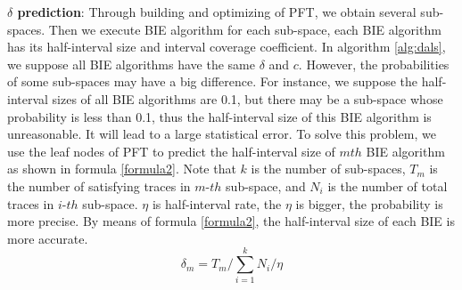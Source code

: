 \textbf{$\delta$ prediction}:
Through building and optimizing of PFT, we obtain several sub-spaces. Then we execute BIE algorithm for each sub-space, each BIE algorithm has its half-interval size and interval coverage coefficient. In algorithm \ref{alg:dals}, we suppose all BIE algorithms have the same $\delta$ and $c$. However, the probabilities of some sub-spaces may have a big difference. For instance, we suppose the half-interval sizes of all BIE algorithms are 0.1, but there may be a sub-space whose probability is less than 0.1, thus the half-interval size of this BIE algorithm is unreasonable. It will lead to a large statistical error. To solve this problem, we use the leaf nodes of PFT to predict the half-interval size of $mth$ BIE algorithm as shown in formula \ref{formula2}. Note that $k$ is the number of sub-spaces, $T_m$ is the number of satisfying traces in $m$-$th$ sub-space, and $N_i$ is the number of total traces in $i$-$th$ sub-space. $\eta$ is half-interval rate, the $\eta$ is bigger, the probability is more precise. By means of formula \ref{formula2}, the half-interval size of each BIE is more accurate.
\begin{equation}
\label{formula2}
\delta_m = T_m / \sum\limits_{i=1}^k N_i / \eta
\end{equation}
